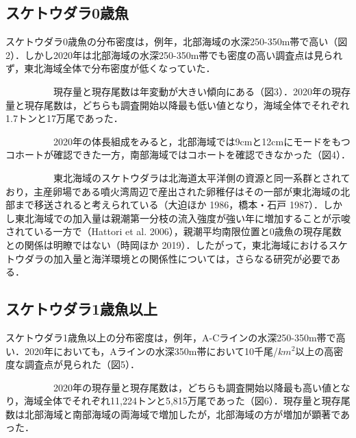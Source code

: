 \documentclass[11pt]{article} %
\begin{document}
\begin{linenumbers}
\subsection{スケトウダラ0歳魚}
スケトウダラ0歳魚の分布密度は，例年，北部海域の水深250-350m帯で高い（図2）．しかし2020年は北部海域の水深250-350m帯でも密度の高い調査点は見られず，東北海域全体で分布密度が低くなっていた．

\ \ \ \ \ \ \ \ \ \ 
現存量と現存尾数は年変動が大きい傾向にある（図3）．2020年の現存量と現存尾数は，どちらも調査開始以降最も低い値となり，海域全体でそれぞれ1.7トンと17万尾であった．

\ \ \ \ \ \ \ \ \ \ 
2020年の体長組成をみると，北部海域では9cmと12cmにモードをもつコホートが確認できた一方，南部海域ではコホートを確認できなかった（図4）．

\ \ \ \ \ \ \ \ \ \ 
東北海域のスケトウダラは北海道太平洋側の資源と同一系群とされており，主産卵場である噴火湾周辺で産出された卵稚仔はその一部が東北海域の北部まで移送されると考えられている（大迫ほか 1986，橋本・石戸 1987）．しかし東北海域での加入量は親潮第一分枝の流入強度が強い年に増加することが示唆されている一方で（Hattori et al. 2006），親潮平均南限位置と0歳魚の現存尾数との関係は明瞭ではない（時岡ほか 2019）．したがって，東北海域におけるスケトウダラの加入量と海洋環境との関係性については，さらなる研究が必要である．

\subsection{スケトウダラ1歳魚以上}
スケトウダラ1歳魚以上の分布密度は，例年，A-Cラインの水深250-350m帯で高い．2020年においても，Aラインの水深350m帯において10千尾/$km^2$以上の高密度な調査点が見られた（図5）．

\ \ \ \ \ \ \ \ \ \ 
2020年の現存量と現存尾数は，どちらも調査開始以降最も高い値となり，海域全体でそれぞれ11,224トンと5,815万尾であった（図6）．現存量と現存尾数は北部海域と南部海域の両海域で増加したが，北部海域の方が増加が顕著であった．


\end{linenumbers}
\end{document}
